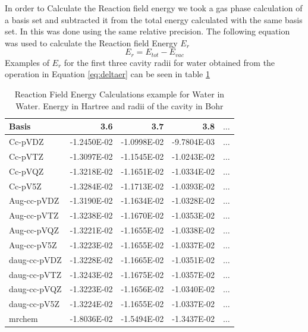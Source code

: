 \documentclass[../master_thesis.tex]{subfiles}
\begin{document}
In order to Calculate the Reaction field energy we took a gas phase calculation
of a basis set and subtracted it from the total energy calculated with the same
basis set. In \mrchem this was done using the same relative precision. The
following equation was used to calculate the Reaction field Energy $E_r$
\begin{equation}\label{eq:deltaer}
  E_r = E_{tot} - E_{vac}
\end{equation}
Examples of $E_r$ for the first three cavity radii for water obtained from the operation
in Equation \ref{eq:deltaer} can be seen in table \ref{tab:Erwatdata}

\begin{table}[htbp]
\caption{Reaction Field Energy Calculations example for Water in Water. Energy in Hartree and radii of the cavity in Bohr}
\begin{center}
\begin{tabular}{|l|r|r|r|r|}
\hline
Basis & 3.6 & 3.7 & 3.8 & $\ldots$\\ \hline
Cc-pVDZ & -1.2450E-02 & -1.0998E-02 & -9.7804E-03 & $\ldots$\\ \hline
Cc-pVTZ & -1.3097E-02 & -1.1545E-02 & -1.0243E-02 & $\ldots$\\ \hline
Cc-pVQZ & -1.3218E-02 & -1.1651E-02 & -1.0334E-02 & $\ldots$\\ \hline
Cc-pV5Z & -1.3284E-02 & -1.1713E-02 & -1.0393E-02 & $\ldots$\\ \hline
Aug-cc-pVDZ & -1.3190E-02 & -1.1634E-02 & -1.0328E-02 & $\ldots$\\ \hline
Aug-cc-pVTZ & -1.3238E-02 & -1.1670E-02 & -1.0353E-02 & $\ldots$\\ \hline
Aug-cc-pVQZ & -1.3221E-02 & -1.1655E-02 & -1.0338E-02 & $\ldots$\\ \hline
Aug-cc-pV5Z & -1.3223E-02 & -1.1655E-02 & -1.0337E-02 & $\ldots$\\ \hline
daug-cc-pVDZ & -1.3228E-02 & -1.1665E-02 & -1.0351E-02 & $\ldots$\\ \hline
daug-cc-pVTZ & -1.3243E-02 & -1.1675E-02 & -1.0357E-02 & $\ldots$\\ \hline
daug-cc-pVQZ & -1.3223E-02 & -1.1656E-02 & -1.0340E-02 & $\ldots$\\ \hline
daug-cc-pV5Z & -1.3224E-02 & -1.1655E-02 & -1.0337E-02 & $\ldots$\\ \hline
mrchem & -1.8036E-02 & -1.5494E-02 & -1.3437E-02 & $\ldots$\\ \hline
\end{tabular}
\end{center}
\label{tab:Erwatdata}
\end{table}
\end{document}
